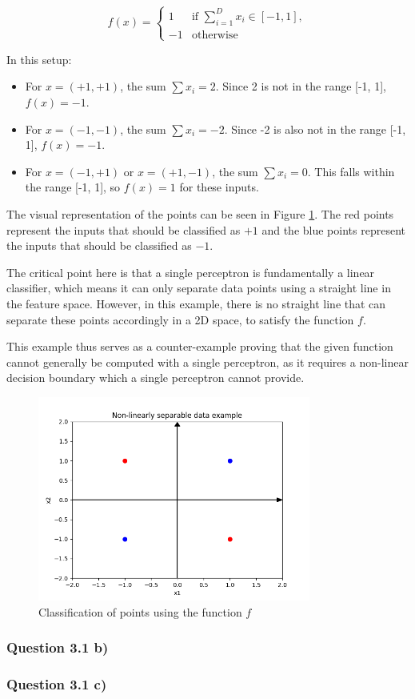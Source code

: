 \documentclass{article}
\begin{document}
\[
f(x) = 
\begin{cases} 
1 & \text{if } \sum_{i=1}^{D} x_i \in [-1, 1], \\
-1 & \text{otherwise}
\end{cases}
\]

In this setup:

\begin{itemize}
    \item For \( x = (+1, +1) \), the sum \( \sum x_i = 2 \). Since 2 is not in the range [-1, 1], \( f(x) = -1 \).
    \item For \( x = (-1, -1) \), the sum \( \sum x_i = -2 \). Since -2 is also not in the range [-1, 1], \( f(x) = -1 \).
    \item For \( x = (-1, +1) \) or \( x = (+1, -1) \), the sum \( \sum x_i = 0 \). This falls within the range [-1, 1], so \( f(x) = 1 \) for these inputs.
\end{itemize}

The visual representation of the points can be seen in Figure \ref{3a Plot}. The red points represent the inputs that should be classified as \( +1 \) and the blue points represent the inputs that should be classified as \( -1 \).

The critical point here is that a single perceptron is fundamentally a linear classifier, which means it can only separate data points using a straight line in the feature space. However, in this example, there is no straight line that can separate these points accordingly in a 2D space, to satisfy the function \( f \).

This example thus serves as a counter-example proving that the given function cannot generally be computed with a single perceptron, as it requires a non-linear decision boundary which a single perceptron cannot provide. 

\begin{figure}[H]
    \centering
    \includegraphics[width=0.8\textwidth]{"3a.png"}
    \caption{Classification of points using the function \( f \)}
    \label{3a Plot}
\end{figure}
\subsubsection{Question 3.1 b)}
\subsubsection{Question 3.1 c)}
\end{document}
